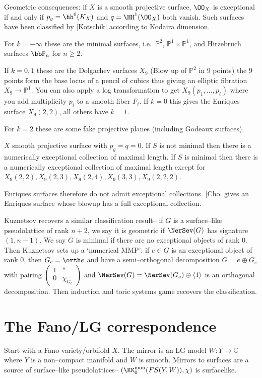 Geometric consequences: if \(X\) is a smooth projective surface, \(\OO_X\) is
exceptional if and only if \(p_g=\hh^0(K_X)\) and \(q=\HH^1(\OO_X)\) both
vanish. Such surfaces have been classified by [Kotschik] according to Kodaira
dimension.

For \(k=-\infty\) these are the minimal surfaces, i.e.\ \(\mathbb{P}^2\),
\(\mathbb{P}^1\times \mathbb{P}^1\), and Hirzebruch surfaces \(\bbF_n\) for
\(n\geq 2\).

If \(k=0,1\) these are the Dolgachev surfaces \(X_9\) (Blow up of
\(\mathbb{P}^2\) in \(9\) points) the \(9\) points form the base locus of a
pencil of cubics thus giving an elliptic fibration \(X_9\to \mathbb{P}^1\). You
can also apply a log transformation to get \(X_9(p_1,...,p_\ell)\) where you add
multiplicity \(p_i\) to a smooth fiber \(F_i\). If \(k=0\) this gives the
Enriques surface \(X_9(2,2)\), all others have \(k=1\).

For \(k=2\) these are some fake projective planes (including Godeaux surfaces).

\begin{theorem}[(Vial)]
    \(X\) smooth projective surface with \(p_g=q=0\). If \(S\) is not minimal
    then there is a numerically exceptional collection of maximal length. If
    \(S\) is minimal then there is a numerically exceptional collection of
    maximal length except for
    \(X_9(2,2),X_9(2,3),X_9(2,4),X_9(3,3),X_9(2,2,2)\).
\end{theorem}

Enriques surfaces therefore do not admit exceptional collections. [Cho] gives an Enriques surface whose blowup has a full exceptional collection.

Kuznetsov recovers a similar classification result-- if \(G\) is a surface--like
pseudolattice of rank \(n+2\), we say it is geometric if \(\NerSev(G)\) has
signature \((1,n-1)\). We say \(G\) is minimal if there are no exceptional
objects of rank \(0\). Then Kuznetsov sets up a `numerical MMP': if \(e\in G\)
is an exceptional object of rank \(0\), then \(G_e=\orth e\) and have a
semi--orthogonal decomposition \(G=e\oplus G_e\) with pairing
\(\begin{pmatrix}1&\ast\\0&\chi_{G_e}\end{pmatrix}\) and
\(\NerSev(G)=\NerSev(G_e)\oplus \langle 1 \rangle\) is an orthogonal decomposition.
Then induction and toric systems game recovers the classification.

\section{The Fano/LG correspondence} Start with a Fano variety/orbifold \(X\).
The mirror is an LG model \(W:Y\to \mathbb{C}\) where \(Y\) is a non--compact
manifold and \(W\) is smooth. Mirrors to surfaces are a source of surface--like
pseudolattices-- \((\KK_0^\text{num}(FS(Y,W)),\chi)\) is surfacelike.

